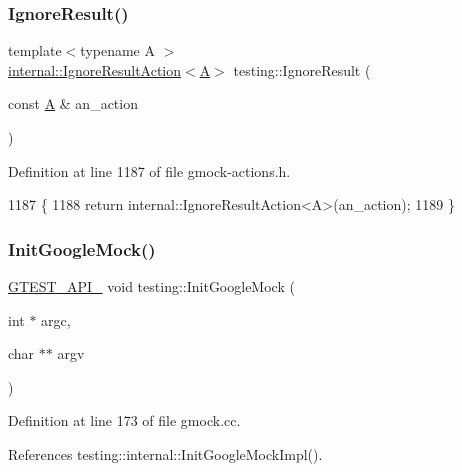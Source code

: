 \subsubsection{\texorpdfstring{Ignore\+Result()}{IgnoreResult()}}
{\footnotesize\ttfamily template$<$typename A $>$ \\
\hyperlink{classtesting_1_1internal_1_1IgnoreResultAction}{internal\+::\+Ignore\+Result\+Action}$<$\hyperlink{namespacetesting_a5e9134d655d2fc9323902348083282e7}{A}$>$ testing\+::\+Ignore\+Result (\begin{DoxyParamCaption}\item[{const \hyperlink{namespacetesting_a5e9134d655d2fc9323902348083282e7}{A} \&}]{an\+\_\+action }\end{DoxyParamCaption})\hspace{0.3cm}{\ttfamily [inline]}}



Definition at line 1187 of file gmock-\/actions.\+h.


\begin{DoxyCode}
1187                                                                       \{
1188   \textcolor{keywordflow}{return} internal::IgnoreResultAction<A>(an\_action);
1189 \}
\end{DoxyCode}
\mbox{\label{namespacetesting_a32b1c6db9ba5133ccabfa67616b3c041}} 
\subsubsection{\texorpdfstring{Init\+Google\+Mock()}{InitGoogleMock()}\hspace{0.1cm}{\footnotesize\ttfamily [1/2]}}
{\footnotesize\ttfamily \hyperlink{gtest-port_8h_aa73be6f0ba4a7456180a94904ce17790}{G\+T\+E\+S\+T\+\_\+\+A\+P\+I\+\_\+} void testing\+::\+Init\+Google\+Mock (\begin{DoxyParamCaption}\item[{int $\ast$}]{argc,  }\item[{char $\ast$$\ast$}]{argv }\end{DoxyParamCaption})}



Definition at line 173 of file gmock.\+cc.



References testing\+::internal\+::\+Init\+Google\+Mock\+Impl().



